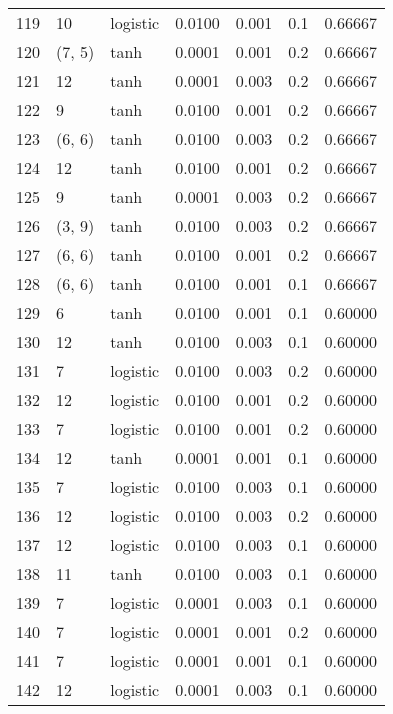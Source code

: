 \begin{tabular}{lllrrrr}
119 &          10 &  logistic &  0.0100 &  0.001 &  0.1 &   0.66667 \\
120 &      (7, 5) &      tanh &  0.0001 &  0.001 &  0.2 &   0.66667 \\
121 &          12 &      tanh &  0.0001 &  0.003 &  0.2 &   0.66667 \\
122 &           9 &      tanh &  0.0100 &  0.001 &  0.2 &   0.66667 \\
123 &      (6, 6) &      tanh &  0.0100 &  0.003 &  0.2 &   0.66667 \\
124 &          12 &      tanh &  0.0100 &  0.001 &  0.2 &   0.66667 \\
125 &           9 &      tanh &  0.0001 &  0.003 &  0.2 &   0.66667 \\
126 &      (3, 9) &      tanh &  0.0100 &  0.003 &  0.2 &   0.66667 \\
127 &      (6, 6) &      tanh &  0.0100 &  0.001 &  0.2 &   0.66667 \\
128 &      (6, 6) &      tanh &  0.0100 &  0.001 &  0.1 &   0.66667 \\
129 &           6 &      tanh &  0.0100 &  0.001 &  0.1 &   0.60000 \\
130 &          12 &      tanh &  0.0100 &  0.003 &  0.1 &   0.60000 \\
131 &           7 &  logistic &  0.0100 &  0.003 &  0.2 &   0.60000 \\
132 &          12 &  logistic &  0.0100 &  0.001 &  0.2 &   0.60000 \\
133 &           7 &  logistic &  0.0100 &  0.001 &  0.2 &   0.60000 \\
134 &          12 &      tanh &  0.0001 &  0.001 &  0.1 &   0.60000 \\
135 &           7 &  logistic &  0.0100 &  0.003 &  0.1 &   0.60000 \\
136 &          12 &  logistic &  0.0100 &  0.003 &  0.2 &   0.60000 \\
137 &          12 &  logistic &  0.0100 &  0.003 &  0.1 &   0.60000 \\
138 &          11 &      tanh &  0.0100 &  0.003 &  0.1 &   0.60000 \\
139 &           7 &  logistic &  0.0001 &  0.003 &  0.1 &   0.60000 \\
140 &           7 &  logistic &  0.0001 &  0.001 &  0.2 &   0.60000 \\
141 &           7 &  logistic &  0.0001 &  0.001 &  0.1 &   0.60000 \\
142 &          12 &  logistic &  0.0001 &  0.003 &  0.1 &   0.60000 \\

\end{tabular}

